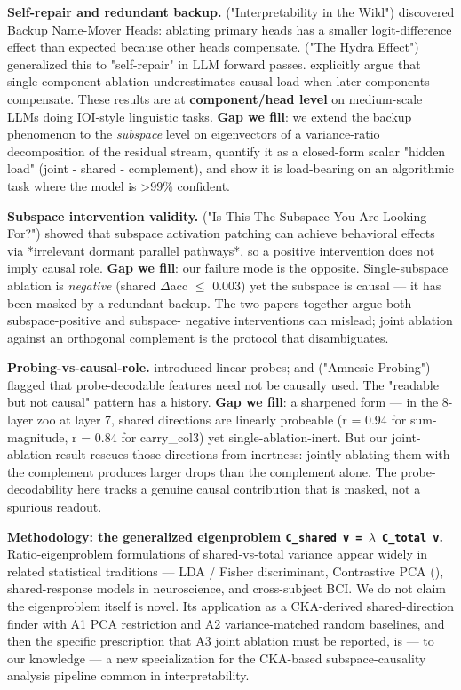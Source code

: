 \textbf{Self-repair and redundant backup.} \citet{wang2023iw} ("Interpretability
in the Wild") discovered Backup Name-Mover Heads: ablating primary
heads has a smaller logit-difference effect than expected because other
heads compensate. \citet{mcgrath2023hydra} ("The Hydra Effect") generalized
this to "self-repair" in LLM forward passes. \citet{rushing2024selfrepair}
explicitly argue that single-component ablation underestimates causal
load when later components compensate. These results are at
\textbf{component/head level} on medium-scale LLMs doing IOI-style
linguistic tasks. \textbf{Gap we fill}: we extend the backup phenomenon to
the \emph{subspace} level on eigenvectors of a variance-ratio
decomposition of the residual stream, quantify it as a closed-form
scalar "hidden load" (joint - shared - complement), and show it is
load-bearing on an algorithmic task where the model is >99\% confident.

\textbf{Subspace intervention validity.} \citet{makelov2023subspace} ("Is
This The Subspace You Are Looking For?") showed that subspace
activation patching can achieve behavioral effects via *irrelevant
dormant parallel pathways*, so a positive intervention does not imply
causal role. \textbf{Gap we fill}: our failure mode is the opposite.
Single-subspace ablation is \emph{negative} (shared $\Delta$acc $\leq$ 0.003) yet the
subspace is causal --- it has been masked by a redundant backup. The
two papers together argue both subspace-positive and subspace-
negative interventions can mislead; joint ablation against an
orthogonal complement is the protocol that disambiguates.

\textbf{Probing-vs-causal-role.} \citet{alain2017probes} introduced linear
probes; \citet{hewitt2019designing} and \citet{elazar2021amnesic} ("Amnesic
Probing") flagged that probe-decodable features need not be causally
used. The "readable but not causal" pattern has a history. \textbf{Gap we fill}: a sharpened form --- in the 8-layer zoo at layer 7, shared
directions are linearly probeable (r = 0.94 for sum-magnitude, r = 0.84
for carry\_col3) yet single-ablation-inert. But our joint-ablation
result rescues those directions from inertness: jointly ablating them
with the complement produces larger drops than the complement alone.
The probe-decodability here tracks a genuine causal contribution that
is masked, not a spurious readout.

\textbf{Methodology: the generalized eigenproblem \texttt{C\_shared v = $\lambda$ C\_total v}.}
Ratio-eigenproblem formulations of shared-vs-total variance appear
widely in related statistical traditions --- LDA / Fisher discriminant,
Contrastive PCA (\citet{abid2018cpca}), shared-response models in
neuroscience, and cross-subject BCI. We do not claim the eigenproblem
itself is novel. Its application as a CKA-derived shared-direction
finder with A1 PCA restriction and A2 variance-matched random
baselines, and then the specific prescription that A3 joint ablation
must be reported, is --- to our knowledge --- a new specialization for
the CKA-based subspace-causality analysis pipeline common in
interpretability.

